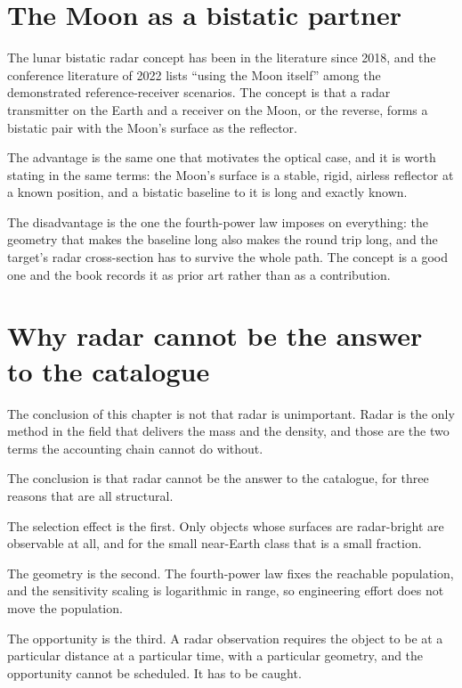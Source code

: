 \section{The Moon as a bistatic partner}

The lunar bistatic radar concept has been in the literature since 2018, and
the conference literature of 2022 lists ``using the Moon itself'' among the
demonstrated reference-receiver scenarios. The concept is that a radar
transmitter on the Earth and a receiver on the Moon, or the reverse, forms a
bistatic pair with the Moon's surface as the reflector.

The advantage is the same one that motivates the optical case, and it is
worth stating in the same terms: the Moon's surface is a stable, rigid,
airless reflector at a known position, and a bistatic baseline to it is long
and exactly known.

The disadvantage is the one the fourth-power law imposes on everything: the
geometry that makes the baseline long also makes the round trip long, and
the target's radar cross-section has to survive the whole path. The concept
is a good one and the book records it as prior art rather than as a
contribution.

\section{Why radar cannot be the answer to the catalogue}


The conclusion of this chapter is not that radar is unimportant. Radar is
the only method in the field that delivers the mass and the density, and
those are the two terms the accounting chain cannot do without.

The conclusion is that radar cannot be the answer to the catalogue, for
three reasons that are all structural.

The selection effect is the first. Only objects whose surfaces are
radar-bright are observable at all, and for the small near-Earth class that
is a small fraction.

The geometry is the second. The fourth-power law fixes the reachable
population, and the sensitivity scaling is logarithmic in range, so
engineering effort does not move the population.

The opportunity is the third. A radar observation requires the object to be
at a particular distance at a particular time, with a particular geometry,
and the opportunity cannot be scheduled. It has to be caught.

